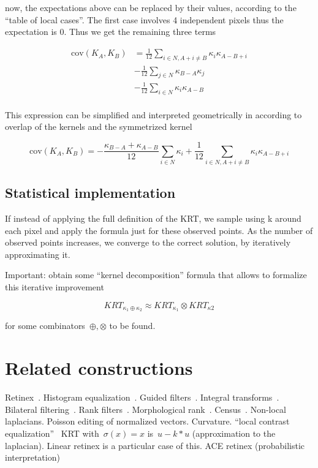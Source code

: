 \documentclass[12pt]{article}                  %
\begin{document}
now, the expectations above can be replaced by their values, according to
the ``table of local cases''.  The first case involves 4 independent pixels
thus the expectation is 0.  Thus we get the remaining three terms

\begin{align*}
	\mathrm{cov}(K_A,K_B)
	&=
	\frac1{12}
	\sum_{i\in N,A+i\neq B}
	\kappa_i\kappa_{A-B+i}
	\\
	&-\frac1{12}
	\sum_{j\in N}
	\kappa_{B-A}\kappa_j
	\\
	&-\frac1{12}
	\sum_{i\in N}
	\kappa_i\kappa_{A-B}
	\\
\end{align*}

This expression can be simplified and interpreted geometrically in according
to overlap of the kernels and the symmetrized kernel


\[
	\mathrm{cov}(K_A,K_B)
	=
	-
	\frac{\kappa_{B-A}+\kappa_{A-B}}{12}
	\sum_{i\in N} \kappa_i
	+
	\frac1{12}
	\sum_{i\in N,A+i\neq B} \kappa_i\kappa_{A-B+i}
\]












\subsection{Statistical implementation}

If instead of applying the full definition of the KRT, we sample using k
around each pixel and apply the formula just for these observed points.  As
the number of observed points increases, we converge to the correct
solution, by iteratively approximating it.

Important: obtain some ``kernel decomposition'' formula that allows to
formalize this iterative improvement

\[
	KRT_{\kappa_1\oplus\kappa_2}\approx KRT_{\kappa_1} \otimes KRT_{\kappa2}
\]

for some combinators~$\oplus,\otimes$ to be found.

\section{Related constructions}

Retinex~\cite{land1971lightness,land1977retinex,land1985recent,kimmel2003variational,provenzi2005mathematical,morel2010pde,petro2014multiscale}.
Histogram equalization~\cite{pizer1987adaptive,abdullah2007dynamic}.
Guided filters~\cite{he2012guided}.
Integral transforms~\cite{bradley2007adaptive}.
Bilateral filtering~\cite{tomasi1998bilateral,durand2002fast,paris2009bilateral}.
Rank filters~\cite{rankfilters1985}.
Morphological rank~\cite{soille2002morphological}.
Census~\cite{ZW,stein2004efficient,whycensus2013}.
Non-local laplacians.
Poisson editing of normalized vectors.
Curvature.
``local contrast equalization''~\cite{sapiro1997histogram}
KRT with~$\sigma(x)=x$ is~$u-k*u$ (approximation to the laplacian).  Linear
retinex is a particular case of this.
ACE retinex (probabilistic interpretation)
\end{document}
